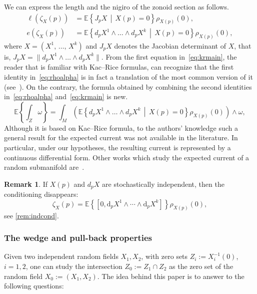 \documentclass[10pt]{amsart}
\theoremstyle{definition}\newtheorem{defi}[theo]{Definition}\newtheorem{rema}[theo]{Remark}\newtheorem{exam}[theo]{Example}\newtheorem{exem}[theo]{Example}\newtheorem{nota}[theo]{Notation}
\newcommand{\EE}{\mathbb{E}}
\newcommand{\dd}{\mathrm{d}}
\begin{document}
We can express the length and the nigiro of the zonoid section as follows.
\begin{equation}\label{eq:krmain}
\begin{split}
\ell(\zeta_X(p))&=\EE\left\{ J_pX\,\middle|\,X(p)=0\right\}\rho_{X(p)}(0), \\
e(\zeta_X(p))&=\EE\left\{ d_pX^1\wedge \dots \wedge d_pX^k\,\middle|\,X(p)=0\right\}\rho_{X(p)}(0),
\end{split}
\end{equation}
where $X=(X^1,\,\ldots,\,X^k)$ and $J_pX$ denotes the Jacobian determinant of $X$, that is, $J_pX=\|d_pX^1\wedge \dots \wedge d_pX^k\|$. From the first equation in~\eqref{eq:krmain}, the reader that is familiar with Kac--Rice formulas, can recognize that the first identity in~\eqref{eq:rhoalpha} is in fact a translation of the most common version of it (see~\cite{AzaisWscheborbook}). On the contrary, the formula obtained by combining the second identities in~\eqref{eq:rhoalpha} and~\eqref{eq:krmain} is new.
\begin{equation}\label{eq:newEcurrent}
\EE\left\{\int_{Z} \omega\right\}=\int_M\left(\EE\left\{ d_pX^1\wedge \dots \wedge d_pX^k\,\middle|\,X(p)=0\right\}\rho_{X(p)}(0)\right)\wedge \omega,
\end{equation}
Although it is based on Kac--Rice formula, to the authors' knowledge such a general result for the expected current was not available in the literature. In particular, under our hypotheses, the resulting current is represented by a continuous differential form. Other works which study the expected current of a random submanifold are~\cite{Ancona_pencils,Dinh2012,
DangRiv2018,LETENDRE2016,Nicolaescu2016, NicSavale,Shiffman1999-hu,Shiffman2008-ru}.
\begin{rema}
If $X(p) $ and $d_pX$ are stochastically independent, then the conditioning disappears:
\[
\zeta_X(p)=\EE\left\{\left[0,\dd_pX^1\wedge\cdots\wedge\dd_p X^k\right] \right\}\rho_{X(p)}(0),
\]
see \cref{rem:indcond}.
\end{rema}

\subsubsection{The wedge and pull-back properties}

Given two independent random fields $X_1,X_2$, with zero sets $Z_i:=X_i^{-1}(0)$, $i=1,2$, one can study the intersection $Z_0:=Z_1\cap Z_2$ as the zero set of the random field $X_0:=(X_1,X_2)$. The idea behind this paper is to answer to the following questions:
\end{document}
